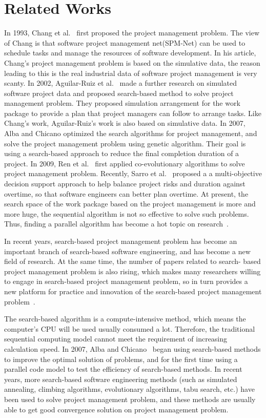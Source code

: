
\section{Related Works}
%
In 1993, Chang et al.~\cite{chang} first proposed the project management problem. The view of 
Chang is that software project management net(SPM-Net) can be used to 
schedule tasks and manage the resources of software development. 
In his article, Chang's project management problem is based on the simulative 
data, the reason leading to this is the real industrial data of software 
project management is very scanty. In 2002, Aguilar-Ruiz et al.~\cite{alba} made a 
further research on simulated software project data and proposed search-based 
method to solve project management problem. They proposed 
simulation arrangement for the work package to provide a plan that project 
managers can follow to arrange tasks. Like Chang’s work, Aguilar-Ruiz's work 
is also based on simulative data. In 2007, Alba and Chicano optimized the 
search algorithms for project management, and solve the project management 
problem using genetic algorithm. Their goal is using a search-based approach 
to reduce the final completion duration of a project. In 2009, Ren et al.~\cite{ren} first 
applied co-evolutionary algorithms to solve project management problem. 
Recently, Sarro et al.~\cite{sarro} proposed a a multi-objective decision support approach to help
balance project risks and duration against overtime, so that software
engineers can better plan overtime. 
At present, the search space of the work package based on the project 
management is more and more huge, the sequential algorithm is not so 
effective to solve such problems. Thus, finding a parallel algorithm has 
become a hot topic on research~\cite{pentico}.


In recent years, search-based project management problem has become an 
important branch of search-based software engineering, and has become a new 
field of research. At the same time, the number of papers related to search-
based project management problem is also rising, which makes many researchers 
willing to engage in search-based project management problem, so in turn 
provides a new platform for practice and innovation of the search-based 
project management problem~\cite{penta}.


The search-based algorithm is a compute-intensive method, which means the
computer's CPU will be used usually consumed a lot. Therefore, the traditional
sequential computing model cannot meet the requirement of increasing calculation
speed. In 2007, Alba and Chicano~\cite{pospichal} began using search-based methods to improve the
optimal solution of problems, and for the first time using a parallel code model
to test the efficiency of search-based methods. In recent
years, more search-based software engineering methods (such as simulated
annealing, climbing algorithms, evolutionary algorithms, tabu search, etc.) have
been used to solve project management problem, and these methods are usually
able to get good convergence solution on project management problem.

